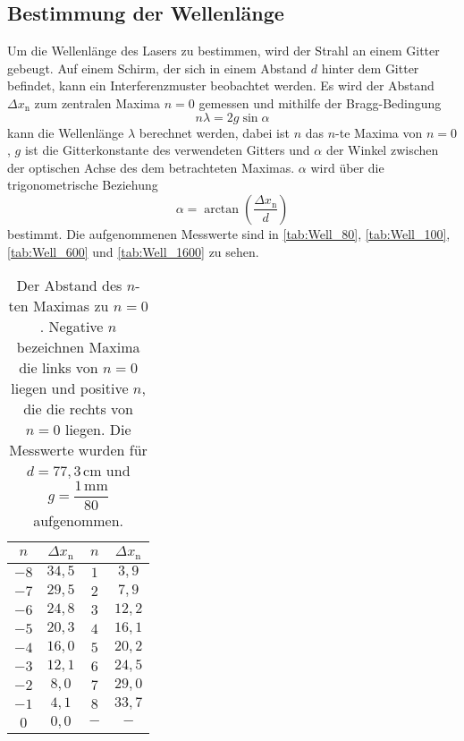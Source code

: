 \subsection{Bestimmung der Wellenlänge}
\label{sec:Wellenlänge}

Um die Wellenlänge des Lasers zu bestimmen, wird der Strahl an einem Gitter gebeugt. Auf einem Schirm, der sich in einem Abstand $d$ hinter dem Gitter befindet, kann ein Interferenzmuster beobachtet werden. Es wird der Abstand $\Delta x_\text{n}$ zum zentralen Maxima $n = 0$ gemessen und mithilfe der Bragg-Bedingung
\begin{equation}
    n \lambda = 2 g \sin{\alpha}
    \label{eq:bragg}
\end{equation}
kann die Wellenlänge $\lambda$ berechnet werden, dabei ist $n$ das $n$-te Maxima von $n=0$, $g$ ist die Gitterkonstante des verwendeten Gitters und $\alpha$ der Winkel zwischen der optischen Achse des dem betrachteten Maximas.
$\alpha$ wird über die trigonometrische Beziehung  
\begin{equation}
    \alpha = \arctan(\frac{\Delta x_\text{n}}{d})
    \label{eq:trig}
\end{equation} 
bestimmt. Die aufgenommenen Messwerte sind in \autoref{tab:Well_80}, \autoref{tab:Well_100}, \autoref{tab:Well_600} und \autoref{tab:Well_1600} zu sehen.

\begin{table}[H]
    \centering
    \caption{Der Abstand des $n$-ten Maximas zu $n = 0$. Negative $n$ bezeichnen Maxima die links von $n = 0$ liegen und positive $n$, die die rechts von $n = 0$ liegen. Die Messwerte wurden für $d = 77,3 \, \unit{\centi\meter}$ und $g = \dfrac{1 \, \unit{\milli\meter}}{80}$ aufgenommen.}
    \label{tab:Well_80}
    \begin{tabular}{c c c c}
    \toprule
     $n$ & $\Delta x_\text{n}$ &   $n$ & $\Delta x_\text{n}$\\
    \midrule
        $-8$  &$ 34,5$ &        $1$ &  $ 3,9$ \\
        $-7$  &$ 29,5$ &        $2$ &  $ 7,9$ \\
        $-6$  &$ 24,8$ &        $3$ &  $12,2$ \\
        $-5$  &$ 20,3$ &        $4$ &  $16,1$ \\
        $-4$  &$ 16,0$ &        $5$ &  $20,2$ \\
        $-3$  &$ 12,1$ &        $6$ &  $24,5$ \\
        $-2$  &$ 8,0 $ &        $7$ &  $29,0$ \\
        $-1$  &$ 4,1 $ &        $8$ &  $33,7$ \\
       $ 0 $  &$ 0,0 $ &        $-$ &  $   -$ \\
    \bottomrule
    \end{tabular}
    \end{table}

